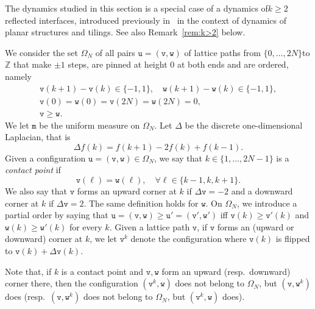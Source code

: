 \documentclass[10pt]{amsart}
\theoremstyle{definition}\newtheorem{defi}[theo]{Definition}\newtheorem{rema}[theo]{Remark}\newtheorem{exam}[theo]{Example}\newtheorem{exem}[theo]{Example}\newtheorem{nota}[theo]{Notation}
\theoremstyle{plain}
\newcommand{\ttv}{\mathtt{v}}
\newcommand{\ttw}{\mathtt{w}}
\newcommand{\ttu}{\mathtt{u}}
\newcommand{\ttm}{\mathtt{m}}
\newcommand{\tu}{\mathtt{u}}
\newcommand{\bbZ}{\mathbb{Z}}
\let\oldforall\forall
\renewcommand*{\forall}{\mathrel{\oldforall}}
\newcounter{setofstep}
\newcounter{step}[setofstep]
\begin{document}
The dynamics studied in this section is a special case of a dynamics of\linebreak $k\ge 2$ reflected interfaces, introduced previously in~\cite{luby2001markov,wilson2004mixing} in the context of dynamics of planar structures and tilings. See also Remark~\ref{rem:k>2} below.

We consider the set $\Omega_N$ of all pairs $\ttu=(\ttv,\ttw)$ of lattice paths from $\{0,\dots,2N\}$\linebreak to $\bbZ$ that make $\pm 1$ steps, are pinned at height $0$ at both ends and are ordered, namely
\begin{gather*}
\ttv(k+1)-\ttv(k) \in \{-1,1\},\quad \ttw(k+1)-\ttw(k) \in \{-1,1\},\\
\ttv(0)=\ttw(0)=\ttv(2N)=\ttw(2N) = 0,\\
\ttv \ge \ttw.
\end{gather*}
We let $\ttm$ be the uniform measure on $\Omega_N$. Let $\Delta$ be the discrete one-dimensional Laplacian, that is
\[
\Delta f(k) = f(k+1) - 2 f(k) + f(k-1).
\]
Given a configuration $\tu=(\ttv,\ttw) \in \Omega_N$, we say that $k\in\{1,\dots,2N-1\}$ is a \emph{contact point} if
\[
\ttv(\ell) = \ttw(\ell),\quad \forall \ell \in \{k-1,k,k+1\}.
\]
We also say that $\ttv$ forms an upward corner at $k$ if $\Delta \ttv = -2$ and a downward corner at $k$ if $\Delta \ttv = 2$. The same definition holds for $\ttw$. On $\Omega_N$, we introduce a partial order by saying that $\ttu=(\ttv,\ttw)\ge \ttu'=(\ttv',\ttw')$ iff $\ttv(k)\ge \ttv'(k)$ and $\ttw(k)\ge \ttw'(k)$ for every $k$. Given a lattice path $\ttv$, if $\ttv$ forms an (upward or downward) corner at $k$, we let $\ttv^k$ denote the configuration where $\ttv(k)$ is flipped to $\ttv(k)+\Delta \ttv(k)$.

Note that, if $k$ is a contact point and $\ttv,\ttw$ form an upward (resp.~downward) corner there, then the configuration $(\ttv^k,\ttw)$ does not belong to $\Omega_N$, but $(\ttv,\ttw^k)$ does (resp.~$(\ttv,\ttw^k)$ does not belong to $\Omega_N$, but $(\ttv^k,\ttw)$ does).
\end{document}

